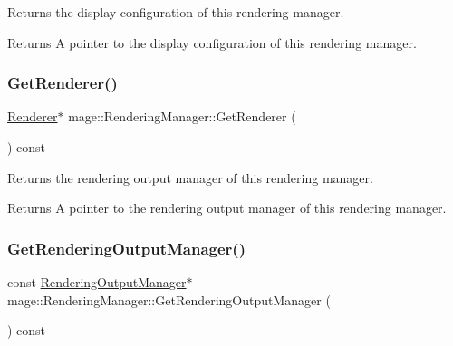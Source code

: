 Returns the display configuration of this rendering manager.

\begin{DoxyReturn}{Returns}
A pointer to the display configuration of this rendering manager. 
\end{DoxyReturn}
\hypertarget{classmage_1_1_rendering_manager_a5b357f9f7e241945ac396cd09ba3be7e}{}\label{classmage_1_1_rendering_manager_a5b357f9f7e241945ac396cd09ba3be7e} 
\subsubsection{\texorpdfstring{Get\+Renderer()}{GetRenderer()}}
{\footnotesize\ttfamily \hyperlink{classmage_1_1_renderer}{Renderer}$\ast$ mage\+::\+Rendering\+Manager\+::\+Get\+Renderer (\begin{DoxyParamCaption}{ }\end{DoxyParamCaption}) const\hspace{0.3cm}{\ttfamily [noexcept]}}

Returns the rendering output manager of this rendering manager.

\begin{DoxyReturn}{Returns}
A pointer to the rendering output manager of this rendering manager. 
\end{DoxyReturn}
\hypertarget{classmage_1_1_rendering_manager_ad24d51b141e5579a3bd8fc63793977fe}{}\label{classmage_1_1_rendering_manager_ad24d51b141e5579a3bd8fc63793977fe} 
\subsubsection{\texorpdfstring{Get\+Rendering\+Output\+Manager()}{GetRenderingOutputManager()}}
{\footnotesize\ttfamily const \hyperlink{classmage_1_1_rendering_output_manager}{Rendering\+Output\+Manager}$\ast$ mage\+::\+Rendering\+Manager\+::\+Get\+Rendering\+Output\+Manager (\begin{DoxyParamCaption}{ }\end{DoxyParamCaption}) const\hspace{0.3cm}{\ttfamily [noexcept]}}


